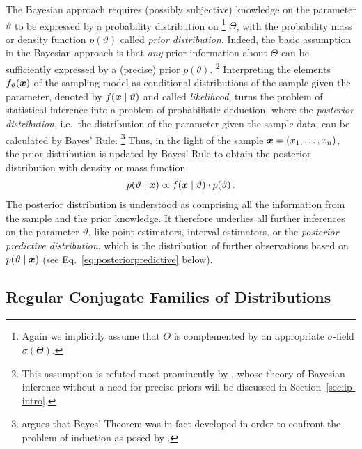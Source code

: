 The Bayesian approach requires (possibly subjective) knowledge on the parameter $\vartheta$ to be expressed by a probability distribution on%
\footnote{Again we implicitly assume that $\Theta$ is complemented by an appropriate $\sigma$-field $\sigma(\Theta)$.}
$\Theta$, with the probability mass or density function $p(\vartheta)$ called \emph{prior distribution}.
Indeed, the basic assumption in the Bayesian approach is that \emph{any} prior information about $\Theta$
can be sufficiently expressed by a (precise) prior $p(\theta)$.%
\footnote{This assumption is refuted most prominently by \textcite{1991:walley},
whose theory of Bayesian inference without a need for precise priors will be discussed in Section~\ref{sec:ip-intro}.}
Interpreting the elements $f_\vartheta({\bm x})$ of the sampling model as conditional distributions of the sample given the parameter,
denoted by $f({\bm x}\mid\vartheta)$ and called \emph{likelihood},
turns the problem of statistical inference into a problem of probabilistic deduction,
where the \emph{posterior distribution}, i.e.\ the distribution of the parameter given the sample data,
can be calculated by Bayes' Rule.%
\footnote{\citeauthor{1987:gillies}  argues
that Bayes' Theorem was in fact developed in order to confront the problem of induction as posed by \textcite{1739:hume}.}
Thus, in the light of the sample ${\bm x}= (x_1, \ldots, x_n)$, the prior distribution is updated by Bayes' Rule
to obtain the posterior distribution with density or mass function
\begin{align}
\label{eq:bayesrule}
p(\vartheta\mid{\bm x}) \propto f({\bm x}\mid\vartheta) \cdot p(\vartheta)\,.
\end{align}
The posterior distribution is understood as comprising all the information from the sample and the prior knowledge.
It therefore underlies all further inferences on the parameter $\vartheta$,
like point estimators, interval estimators,
or the \emph{posterior predictive distribution},
which is the distribution of further observations based on $p(\vartheta\mid{\bm x})$
(see Eq.~\eqref{eq:posteriorpredictive} below).


\subsection{Regular Conjugate Families of Distributions}
\label{sec:regularconjugates}

